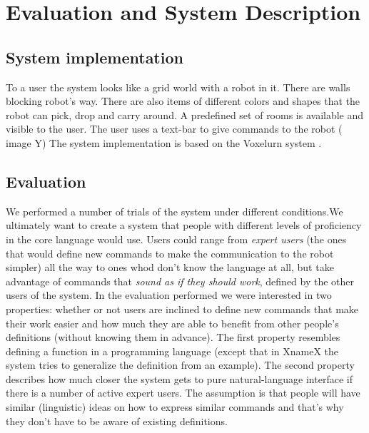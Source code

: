 \section{Evaluation and System Description}
\subsection{System implementation}
To a user the system looks like a grid world with a robot in it. There are walls blocking robot's way. There are also items of different colors and shapes that the robot can pick, drop and carry around.  A predefined set of rooms is available and visible to the user. The user uses a text-bar to give commands to the robot ( image Y)
The system implementation is based on the Voxelurn system \cite{wangVoxelurn}.

\subsection{Evaluation}
We performed a number of trials of the system under different conditions.We ultimately want to create a system that people with different levels of proficiency in the core language would use. Users could range from \emph{expert users}  (the ones that would define new commands to make the communication to the robot simpler) all the way to ones whod don't know the language at all, but take advantage of commands that \emph{sound as if they should work}, defined by the other users of the system.
In the evaluation performed we were interested in two properties: whether or not users are inclined to define new commands that make their work easier and how much they are able to benefit from other people's definitions (without knowing them in advance).  The first property resembles defining a function in a programming language (except that in XnameX the system tries to generalize the definition from an example). The second property describes how much closer the system gets to pure natural-language interface if there is a number of active expert users. The assumption is that people will have similar (linguistic) ideas on how to express similar commands and that's why they don't have to be aware of existing definitions.
